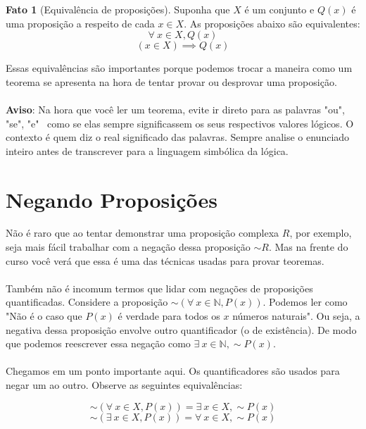 \documentclass[a4paper,11pt]{book}
\theoremstyle{definition}
\theoremstyle{break}
\newtheorem{fact}{Fato}[section]
\begin{document}
\begin{fact}[Equivalência de proposições]
Suponha que $X$ é um conjunto e $Q(x)$ é uma proposição a respeito de cada $x \in X$. As proposições abaixo são equivalentes:
$$ \forall \ x \in X, Q(x) $$
$$ (x \in X) \implies Q(x) $$
\end{fact}

Essas equivalências são importantes porque podemos trocar a maneira como um teorema se apresenta na hora de tentar provar ou desprovar uma proposição.
\\
\\
\textbf{Aviso}: Na hora que você ler um teorema, evite ir direto para as palavras "ou", "se", "e" \ como se elas sempre significassem os seus respectivos valores lógicos. O contexto é quem diz o real significado das palavras. Sempre analise o enunciado inteiro antes de transcrever para a linguagem simbólica da lógica.

\section{Negando Proposições}

Não é raro que ao tentar demonstrar uma proposição complexa $R$, por exemplo, seja mais fácil trabalhar com a negação dessa proposição $\sim R$. Mas na frente do curso você verá que essa é uma das técnicas usadas para provar teoremas.
\\
\\
Também não é incomum termos que lidar com negações de proposições quantificadas. Considere a proposição $\sim(\forall \ x \in \mathbb{N}, P(x))$. Podemos ler como "Não é o caso que $P(x)$ é verdade para todos os $x$ números naturais". Ou seja, a negativa dessa proposição envolve outro quantificador (o de existência). De modo que podemos reescrever essa negação como $\exists \ x \in \mathbb{N},\sim P(x)$.
\\
\\
Chegamos em um ponto importante aqui. Os quantificadores são usados para negar um ao outro. Observe as seguintes equivalências:

$$ \sim (\forall \ x \in X, P(x)) = \exists \ x \in X, \sim P(x) $$
$$ \sim (\exists \ x \in X, P(x)) = \forall \ x \in X, \sim P(x) $$
\end{document}
